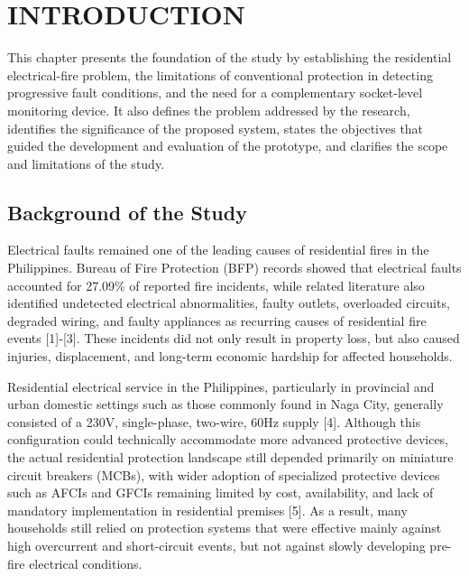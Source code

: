 ﻿\chapter{INTRODUCTION}\label{chap:introduction}

This chapter presents the foundation of the study by establishing the
residential electrical-fire problem, the limitations of conventional
protection in detecting progressive fault conditions, and the need for a
complementary socket-level monitoring device. It also defines the
problem addressed by the research, identifies the significance of the
proposed system, states the objectives that guided the development and
evaluation of the prototype, and clarifies the scope and limitations of
the study.

\section{Background of the Study}\label{background-of-the-study}

Electrical faults remained one of the leading causes of residential
fires in the Philippines. Bureau of Fire Protection (BFP) records showed that
electrical faults accounted for 27.09\% of reported fire incidents,
while related literature also identified undetected electrical
abnormalities, faulty outlets, overloaded circuits, degraded wiring, and
faulty appliances as recurring causes of residential fire events
{[}1{]}-{[}3{]}. These incidents did not only result in property loss,
but also caused injuries, displacement, and long-term economic hardship
for affected households.

Residential electrical service in the Philippines, particularly in
provincial and urban domestic settings such as those commonly found in
Naga City, generally consisted of a 230V, single-phase, two-wire, 60Hz
supply {[}4{]}. Although this configuration could technically
accommodate more advanced protective devices, the actual residential
protection landscape still depended primarily on miniature circuit
breakers (MCBs), with wider adoption of specialized protective devices
such as AFCIs and GFCIs remaining limited by cost, availability, and
lack of mandatory implementation in residential premises {[}5{]}. As a result,
many households still relied on protection systems that were effective
mainly against high overcurrent and short-circuit events, but not
against slowly developing pre-fire electrical conditions.

